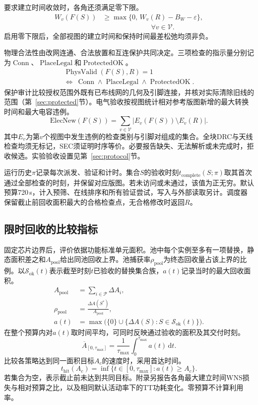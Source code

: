 \documentclass[twocolumn,10pt,fontset=windows]{ctexart}
\begin{document}
要求建立时间收敛时，各角还须满足零下限。
\begin{equation}
\label{eq:setup_floor}
\begin{aligned}
W_v(F(S)) &\ge \max\{0,\,W_v(R)-B_W-\varepsilon\},\\
          &\hspace{7em}\forall v\in\mathcal V.
\end{aligned}
\end{equation}
启用零下限后，全部视图的建立时间和保持时间最差松弛均须非负。

物理合法性由改网连通、合法放置和互连保护共同决定。三项检查的指示量分别记为$\operatorname{Conn}$、$\operatorname{PlaceLegal}$和$\operatorname{ProtectedOK}$。
\[
\begin{gathered}
\operatorname{PhysValid}(F(S),R)=1\\
\Longleftrightarrow\
\operatorname{Conn}\land\operatorname{PlaceLegal}\land\operatorname{ProtectedOK}.
\end{gathered}
\]
保护审计比较授权范围外既有已布线网的几何及引脚连接，并核对实际清除旧线的范围（第~\ref{sec:protected}节）。电气验收按视图统计相对参考版图新增的最大转换时间和最大电容违例。
\[
\mathrm{ElecNew}(F(S))=\sum_{v\in\mathcal V}
\bigl|E_v(F(S))\setminus E_v(R)\bigr|.
\]
其中$E_v$为第$v$个视图中发生违例的检查类别与引脚对组成的集合。全块DRC与天线检查均须无标记，SEC须证明时序等价。必要报告缺失、无法解析或未完成时，拒收候选。实验验收设置见第~\ref{sec:protocol}节。

运行历史$\pi$记录每次派发、验证和计时。集合$S$的验收时刻$t_{\mathrm{complete}}(S;\pi)$取其首次通过全部检查的时刻，并保留对应版图。若未访问或未通过，该值为正无穷。默认预算720\,s，计入预筛、在线排序和所有验证尝试，写入与外部读取另计。调度器保留截止前回收面积最大的合格检查点，无合格修改时返回$R$。

\subsection{限时回收的比较指标}

固定芯片边界后，评价依据功能标准单元面积。池中每个实例至多有一项替换，静态面积差之和$A_{\mathrm{pool}}$给出同池回收上界。池捕获率$\rho_{\mathrm{pool}}$为终态回收量占该上界的比例。以$\mathcal S_{\mathrm{ok}}(t)$表示截至时刻$t$已验收的替换集合族，$a(t)$记录当时的最大回收面积。
\[
\begin{aligned}
A_{\mathrm{pool}} &= \sum_{i\in\mathcal P}\Delta A_i,\\
\rho_{\mathrm{pool}} &= \frac{\Delta A(S^*)}{A_{\mathrm{pool}}},\\
a(t) &= \max\bigl(\{0\}\cup\{\Delta A(S):S\in\mathcal S_{\mathrm{ok}}(t)\}\bigr).
\end{aligned}
\]
在整个预算内对$a(t)$取时间平均，可同时反映通过验收的面积及其交付时刻。
\begin{equation}
\label{eq:auc}
\overline{A}_{[0,\tau_{\max}]}=\frac{1}{\tau_{\max}}\int_0^{\tau_{\max}}a(t)\,\mathrm{d}t .
\end{equation}
比较各策略达到同一面积目标$A_c$的速度时，采用首达时间。
\[
t_{\mathrm{hit}}(A_c)=\inf\{t\in[0,\tau_{\max}]:a(t)\ge A_c\}.
\]
若集合为空，表示截止前未达到共同目标。附录另报告各角最大建立时间WNS损失与相对预算之比，以及相同默认活动率下的TT功耗变化。零预算不计算利用率。
\end{document}
